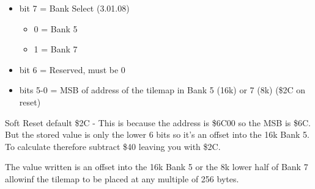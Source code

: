 \begin{itemize}
\item bit 7 = Bank Select (3.01.08)
\begin{itemize}
\item[] 0 = Bank 5
\item[] 1 = Bank 7
\end{itemize}
\item bit 6 = Reserved, must be 0
\item bits 5-0 = MSB of address of the tilemap in Bank 5 (16k) or 7 (8k)
(\$2C on reset)
\end{itemize}
Soft Reset default \$2C - This is because the address is \$6C00 so the
MSB is \$6C. But the stored value is only the lower 6 bits so it's an
offset into the 16k Bank 5. To calculate therefore subtract \$40
leaving you with \$2C.

The value written is an offset into the 16k Bank 5 or the 8k lower
half of Bank 7 allowinf the tilemap to be placed at any multiple of
256 bytes.

